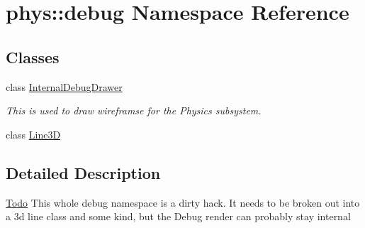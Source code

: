 \hypertarget{namespacephys_1_1debug}{
\section{phys::debug Namespace Reference}
\label{d0/d53/namespacephys_1_1debug}
}
\subsection*{Classes}
\begin{DoxyCompactItemize}
\item 
class \hyperlink{classphys_1_1debug_1_1InternalDebugDrawer}{InternalDebugDrawer}
\begin{DoxyCompactList}\small\item\em This is used to draw wireframse for the Physics subsystem. \item\end{DoxyCompactList}\item 
class \hyperlink{classphys_1_1debug_1_1Line3D}{Line3D}
\end{DoxyCompactItemize}


\subsection{Detailed Description}
\begin{Desc}
\item[\hyperlink{todo__todo000012}{Todo}]This whole debug namespace is a dirty hack. It needs to be broken out into a 3d line class and some kind, but the Debug render can probably stay internal \end{Desc}
